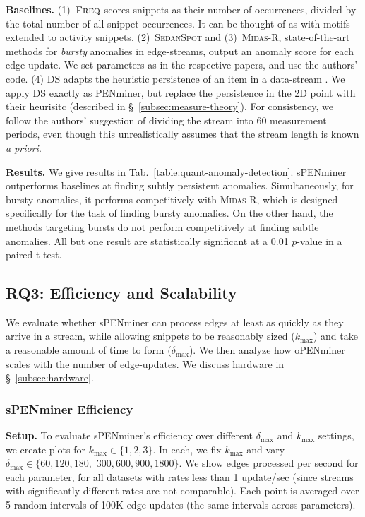 \documentclass[sigconf]{acmart}
\newcommand{\method}{PENminer\xspace}
\newcommand{\methodOffline}{oPENminer\xspace}
\newcommand{\methodOnline}{sPENminer\xspace}
\newcommand{\patternSize}{k}
\newcommand{\duration}{\delta}
\newcommand{\maxDuration}{\duration_{\max}}
\newcommand{\maxSize}{\patternSize_{\max}}
\newcommand{\rThree}{\textbf{RQ3}}
\newcommand{\sedanspot}{\textsc{SedanSpot}\xspace}
\newcommand{\midas}{\textsc{Midas-R}\xspace}
\newcommand{\ds}{\textsc{DS}\xspace}
\newcommand{\freqBaseline}{\textsc{Freq}\xspace}
\begin{document}
\noindent \textbf{Baselines.} 
{(1)~$\freqBaseline$ scores snippets as their number of occurrences, divided by the total number of all snippet occurrences. It can be thought of as \cite{paranjape2017motifs} with motifs extended to activity snippets. (2)~\sedanspot \cite{eswaran2018sedanspot} and (3)~\midas \cite{bhatia2020midas}, state-of-the-art methods for \emph{bursty} anomalies in edge-streams, output an anomaly score for each edge update. We set parameters as in the respective papers, and use the authors' code. (4) \ds adapts the heuristic persistence of an item in a data-stream \cite{dai2016finding}. 
We apply \ds exactly as \method, but replace the persistence in the 2D point with their heurisitc (described in \S~\ref{subsec:measure-theory}). For consistency, we follow the authors' suggestion of dividing the stream into 60 measurement periods, even though this unrealistically assumes that the stream length is known \emph{a priori}.}


\vspace{0.1cm}
\noindent \textbf{Results.} We give results in Tab.~\ref{table:quant-anomaly-detection}. \methodOnline outperforms baselines at finding subtly persistent anomalies. Simultaneously, for bursty anomalies, 
it performs competitively with \midas, which is designed specifically for the task of finding bursty anomalies. 
On the other hand, the methods targeting bursts do not perform competitively at finding subtle anomalies. 
{All but one result are statistically significant at a  0.01 $p$-value in a paired t-test.}







\subsection{\rThree{}: Efficiency and Scalability}
\label{subsec:scale}
We evaluate whether \methodOnline can process edges at least as quickly as they arrive in a stream, 
while allowing snippets to be reasonably sized ($\maxSize$) and take a reasonable amount of time to form ($\maxDuration$).
We then analyze how \methodOffline scales with the number of edge-updates. We discuss hardware in \S~\ref{subsec:hardware}.

\subsubsection{\methodOnline Efficiency} 
\textbf{Setup.} 
To evaluate \methodOnline's efficiency over different $\maxDuration$ and $\maxSize$ settings, we create plots for $\maxSize \in \{1, 2, 3\}$. In each, we fix $\maxSize$ and vary $\maxDuration \in \{60, 120, 180, $ $300, 600, 900, 1800\}$. We show edges processed per second for each parameter, for all datasets with rates less than 1 update/sec (since streams with significantly different rates are not comparable). Each point is averaged over 5 random intervals of 100K edge-updates (the same intervals across parameters).
\end{document}
